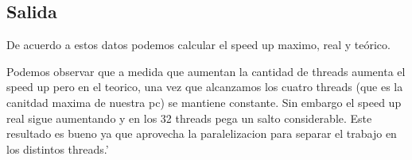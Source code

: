 \subsection{Salida}
    \begin{figure}[ht]
    \end{figure}
    \FloatBarrier

    De acuerdo a estos datos podemos calcular el speed up maximo, real y teórico.

    \begin{figure}[ht]
    \end{figure}
    \FloatBarrier
    \begin{figure}[ht]
    \end{figure}
    \FloatBarrier

    Podemos observar que a medida que aumentan la cantidad de threads aumenta
    el speed up pero en el teorico, una vez que alcanzamos los cuatro threads
    (que es la canitdad maxima de nuestra pc) se mantiene constante. Sin embargo
    el speed up real sigue aumentando y en los 32 threads pega un salto
    considerable. Este resultado es bueno ya que aprovecha la paralelizacion
    para separar el trabajo en los distintos threads.'\